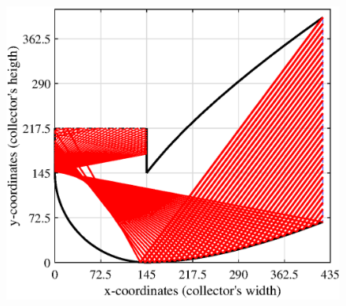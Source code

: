 \begin{figure}[ht!]
	\begin{minipage}{0.48\columnwidth}
		\includegraphics[scale=0.48]{figs/RT2D-hts72.eps}
		

\end{minipage}
\end{figure}
